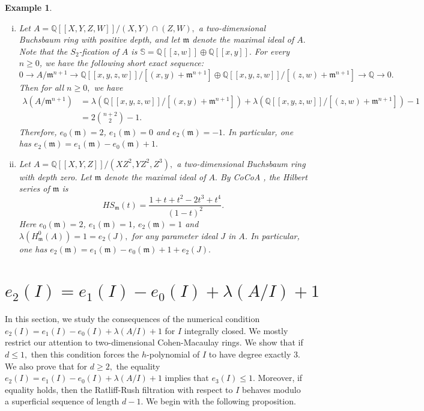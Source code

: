 \documentclass[11pt]{amsart}
\theoremstyle{plain}
\newtheorem{example}[theorem]{Example}
\newcommand{\m}{\mathfrak{m}}
\theoremstyle{plain}
\begin{document}
 \begin{example} \normalfont
 \begin{enumerate} [(i)]
     \item \cite[Example 4.7]{GHEZZI_GOTO_HONG_VASCONCELOS_2017}
     Let $A=\mathbb Q[[X,Y,Z,W]]/(X,Y)\cap(Z,W),$ a two-dimensional Buchsbaum ring with positive depth, and let $\m$ denote the maximal ideal of $A.$ Note that the $S_{2}$-fication of $A$ is $\mathbb{S}=\mathbb Q[[z,w]]\oplus \mathbb Q[[x,y]].$  For every $n \geq 0$, we have the following short exact sequence:
\[0\longrightarrow A/\m^{n+1}\longrightarrow  \mathbb Q[[x,y,z,w]]/[(x,y)+\m^{n+1}] \oplus   \mathbb Q[[x,y,z,w]]/[(z,w)+\m^{n+1}]\longrightarrow \mathbb Q \longrightarrow 0.\]
Then for all $n \geq 0, $ we have
\begin{equation*}
    \begin{split}
    \lambda (A/\m^{n+1})&=\lambda\left( \mathbb Q[[x,y,z,w]]/[(x,y)+\m^{n+1}] \right)+\lambda\left( \mathbb Q[[x,y,z,w]]/[(z,w)+\m^{n+1}] \right)-1\\
    &=2\binom{n+2}{2}-1.
\end{split}
\end{equation*}
     Therefore, $e_{0}(\m)=2$, $e_{1}(\m)=0$ and $e_{2}(\m)=-1.$ In particular, one has $e_{2}(\m)=e_{1}(\m)-e_{0}(\m)+1.$

     \item \cite[Remark 2.8]{goto1} Let $A=\mathbb Q[[X,Y,Z]]/(XZ^2,YZ^2,Z^3),$   a two-dimensional Buchsbaum ring with depth zero. Let $\m$ denote the maximal ideal of $A.$ By CoCoA \cite{cocoa}, the Hilbert series of $\m$ is
     \begin{equation*}
         HS_{\m}(t)=\frac{1 + t + t^2 - 2t^3 + t^4}{(1-t)^2}.
     \end{equation*}
     Here $e_{0}(\m)=2$, $e_{1}(\m)=1$, $e_{2}(\m)=1$ and $\lambda\left(H^{0}_{\m}(A)\right)=1=e_{2}(J),$ for any parameter ideal $J$ in $A$. In particular, one has $e_{2}(\m)=e_{1}(\m)-e_{0}(\m)+1+e_{2}(J).$
 \end{enumerate}
 \end{example}


\section[]{ $e_{2}(I)= e_{1}(I)-e_{0}(I)+\lambda(A/I)+1$}

In this section, we study the consequences of the numerical condition $e_{2}(I)=e_{1}(I)-e_{0}(I)+\lambda(A/I)+1$ for $I$ integrally closed. We mostly restrict our attention to  two-dimensional Cohen-Macaulay rings.
We show that if $d \leq 1,$ then this  condition forces the $h$-polynomial of $I$ to have degree exactly 3. We also prove that for $d\geq 2,$ the equality $e_{2}(I)=e_{1}(I)-e_{0}(I)+\lambda(A/I)+1$ implies that $e_{3}(I) \leq 1.$ Moreover, if equality holds, then the Ratliff-Rush filtration with respect to $I$ behaves modulo a superficial sequence of length $d-1.$ 
We begin with the following proposition. %
\end{document}
